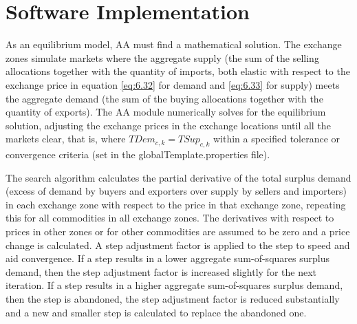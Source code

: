 \section{Software Implementation}
As an equilibrium model, AA must find a mathematical solution. The exchange zones simulate markets where the aggregate supply (the sum of the selling allocations together with the quantity of imports, both elastic with respect to the exchange price in equation \ref{eq:6.32} for demand and \ref{eq:6.33} for supply) meets the aggregate demand (the sum of the buying allocations together with the quantity of exports). The AA module numerically solves for the equilibrium solution, adjusting the exchange prices in the exchange locations until all the markets clear, that is, where $TDem_{c,k} = TSup_{c,k}$ within a specified tolerance or convergence criteria (set in the 
globalTemplate.properties file).

The search algorithm calculates the partial derivative of the total surplus demand (excess of demand by buyers and exporters over supply by sellers and importers) in each exchange zone with respect to the price in that exchange zone, repeating this for all commodities in all exchange zones. The derivatives with respect to prices in other zones or for other commodities are assumed to be zero and a price change is calculated. A step adjustment factor is applied to the step to speed and aid convergence. If a step results in a lower aggregate sum-of-squares surplus demand, then the step adjustment factor is increased slightly for the next iteration. If a step results in a higher aggregate sum-of-squares surplus demand, then the step is abandoned, the step adjustment factor is reduced substantially and a new and smaller step is calculated to replace the abandoned one.

